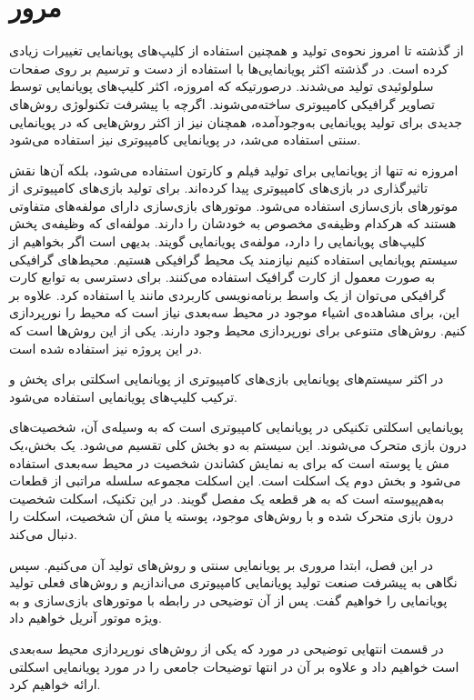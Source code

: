 \chapter { مرور }

از گذشته تا امروز نحوه‌ی تولید و همچنین استفاده از کلیپ‌های پویانمایی تغییرات زیادی کرده است.
در گذشته اکثر پویانمایی‌ها با استفاده از دست و ترسیم بر روی صفحات سلولوئیدی تولید می‌شدند.
درصورتیکه که امروزه، اکثر کلیپ‌های پویانمایی توسط تصاویر گرافیکی کامپیوتری ساخته‌می‌شوند.
اگرچه با پیشرفت تکنولوژی روش‌های جدیدی برای تولید پویانمایی به‌وجودآمده، همچنان نیز از اکثر روش‌هایی که در 
پویانمایی سنتی استفاده می‌شد، در پویانمایی کامپیوتری نیز استفاده می‌شود.

امروزه نه تنها از پویانمایی برای تولید فیلم و کارتون استفاده می‌شود، بلکه آن‌ها نقش 
تاثیرگذاری در بازی‌های کامپیوتری پیدا کرده‌اند.
برای تولید بازی‌های کامپیوتری از موتور‌های بازی‌سازی استفاده می‌شود.
موتور‌های بازی‌سازی دارای مولفه‌های متفاوتی هستند که هرکدام وظیفه‌ی مخصوص به خودشان را دارند.
مولفه‌ای که وظیفه‌ی پخش کلیپ‌های پویانمایی را دارد، مولفه‌ی پویانمایی گویند.
بدیهی است اگر بخواهیم از سیستم پویانمایی استفاده کنیم نیازمند یک محیط گرافیکی هستیم.
محیط‌های گرافیکی به صورت معمول از کارت گرافیک استفاده می‌کنند. برای دسترسی به توابع 
کارت گرافیکی می‌توان از یک واسط برنامه‌نویسی کاربردی مانند 
یا
استفاده کرد.
علاوه بر این، برای مشاهده‌ی اشیاء موجود در محیط سه‌بعدی نیاز است که محیط را نورپردازی کنیم.
روش‌های متنوعی برای نورپردازی محیط وجود دارند. یکی از این روش‌ها 
است که در این پروژه نیز استفاده شده است.

در اکثر سیستم‌های پویانمایی بازی‌های کامپیوتری از پویانمایی اسکلتی برای پخش و ترکیب کلیپ‌های پویانمایی 
استفاده می‌شود.

پویانمایی اسکلتی تکنیکی در پویانمایی کامپیوتری است که به وسیله‌ی آن، شخصیت‌های درون بازی متحرک می‌شوند. 
این سیستم به دو بخش کلی تقسیم می‌شود.
یک بخش،یک مش یا پوسته است که برای به نمایش کشاندن شخصیت در محیط سه‌بعدی استفاده می‌شود و بخش دوم یک اسکلت است. این اسکلت مجموعه سلسله مراتبی از قطعات به‌‌هم‌پیوسته است که به هر قطعه یک مفصل گویند.
در این تکنیک، اسکلت شخصیت درون بازی متحرک شده و با روش‌های موجود، پوسته یا مش آن شخصیت، اسکلت را دنبال می‌کند.


در این فصل، ابتدا مروری بر پویانمایی سنتی و روش‌های تولید آن می‌کنیم. سپس نگاهی به 
پیشرفت صنعت تولید پویانمایی کامپیوتری می‌اندازیم و روش‌های فعلی تولید پویانمایی را خواهیم گفت.
پس از آن توضیحی در رابطه با موتور‌های بازی‌سازی و به ویژه موتور آنریل خواهیم داد.

در قسمت انتهایی توضیحی در مورد 
که یکی از روش‌های نورپردازی محیط سه‌بعدی است خواهیم داد و علاوه بر آن
در انتها توضیحات جامعی را در مورد پویانمایی اسکلتی ارائه خواهیم کرد.

